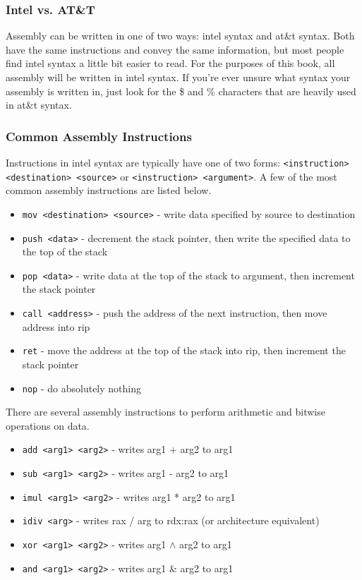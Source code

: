 \subsubsection{Intel vs. AT\&T}
Assembly can be written in one of two ways: intel syntax and at\&t syntax. Both
have the same instructions and convey the same information, but most people find
intel syntax a little bit easier to read. For the purposes of this book, all
assembly will be written in intel syntax. If you're ever unsure what syntax your
assembly is written in, just look for the \$ and \% characters that are heavily
used in at\&t syntax.

\subsubsection{Common Assembly Instructions}
Instructions in intel syntax are typically have one of two forms:
\texttt{<instruction> <destination> <source>} or \texttt{<instruction>
<argument>}. A few of the most common assembly instructions are listed below.

\begin{itemize}
    \item \texttt{mov <destination> <source>} - write data specified by source
        to destination
    \item \texttt{push <data>} - decrement the stack pointer, then write the
        specified data to the top of the stack
    \item \texttt{pop <data>} - write data at the top of the stack to argument,
        then increment the stack pointer
    \item \texttt{call <address>} - push the address of the next instruction,
        then move address into rip
    \item \texttt{ret} - move the address at the top of the stack into rip,
        then increment the stack pointer
    \item \texttt{nop} - do absolutely nothing
\end{itemize}

There are several assembly instructions to perform arithmetic and bitwise
operations on data.

\begin{itemize}
    \item \texttt{add <arg1> <arg2>} - writes arg1 + arg2 to arg1
    \item \texttt{sub <arg1> <arg2>} - writes arg1 - arg2 to arg1
    \item \texttt{imul <arg1> <arg2>} - writes arg1 * arg2 to arg1
    \item \texttt{idiv <arg>} - writes rax / arg to rdx:rax (or architecture
        equivalent)
    \item \texttt{xor <arg1> <arg2>} - writes arg1 $\wedge$ arg2 to arg1
    \item \texttt{and <arg1> <arg2>} - writes arg1 \& arg2 to arg1
\end{itemize}

